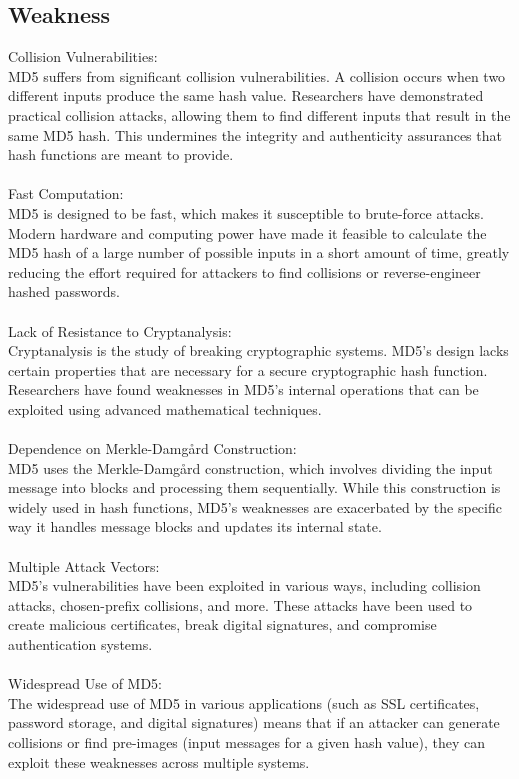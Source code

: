 \documentclass{report}
\begin{document}
\subsection{Weakness}

Collision Vulnerabilities:\\
 MD5 suffers from significant collision vulnerabilities. A collision occurs when two different inputs produce the same hash value. Researchers have demonstrated practical collision attacks, allowing them to find different inputs that result in the same MD5 hash. This undermines the integrity and authenticity assurances that hash functions are meant to provide.\\
\\
Fast Computation:\\
 MD5 is designed to be fast, which makes it susceptible to brute-force attacks. Modern hardware and computing power have made it feasible to calculate the MD5 hash of a large number of possible inputs in a short amount of time, greatly reducing the effort required for attackers to find collisions or reverse-engineer hashed passwords.\\
\\
Lack of Resistance to Cryptanalysis:\\ Cryptanalysis is the study of breaking cryptographic systems. MD5's design lacks certain properties that are necessary for a secure cryptographic hash function. Researchers have found weaknesses in MD5's internal operations that can be exploited using advanced mathematical techniques.\\
\\
Dependence on Merkle-Damgård Construction:\\
 MD5 uses the Merkle-Damgård construction, which involves dividing the input message into blocks and processing them sequentially. While this construction is widely used in hash functions, MD5's weaknesses are exacerbated by the specific way it handles message blocks and updates its internal state.\\
\\
Multiple Attack Vectors:\\
 MD5's vulnerabilities have been exploited in various ways, including collision attacks, chosen-prefix collisions, and more. These attacks have been used to create malicious certificates, break digital signatures, and compromise authentication systems.\\
\\
Widespread Use of MD5:\\
 The widespread use of MD5 in various applications (such as SSL certificates, password storage, and digital signatures) means that if an attacker can generate collisions or find pre-images (input messages for a given hash value), they can exploit these weaknesses across multiple systems.
 
\end{document}

